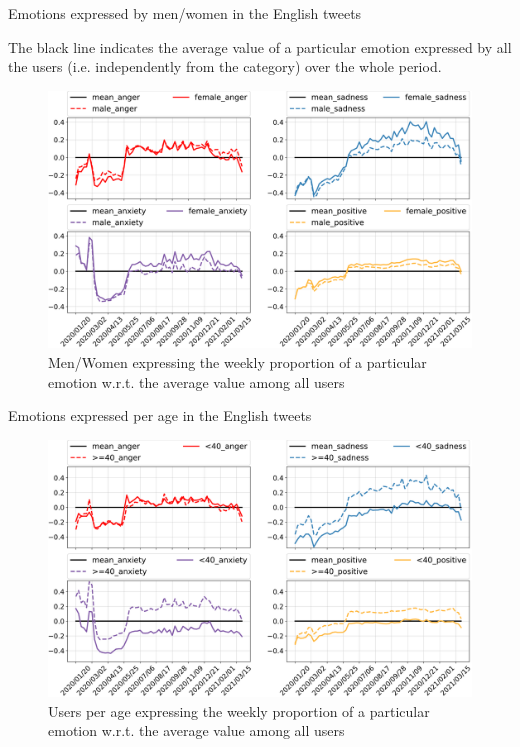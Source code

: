 \documentclass[9pt,aspectratio=1610]{beamer}  %
\begin{document}
\begin{frame}{Emotions expressed by men/women in the English tweets}

    The black line indicates the average value of a particular emotion expressed by all the users (i.e. independently from the category) over the whole period.

    \begin{figure}[H]
	    \centering
    	\includegraphics[scale=.25]{assets/img/en_4_categories_per_gender_over_mean_subplot.svg.pdf}
    	\caption{Men/Women expressing the weekly proportion of a particular emotion w.r.t. the average value among all users}
    	\label{fig:en-4-categories-per-gender-over-mean}
    \end{figure}
    
\end{frame}

\begin{frame}{Emotions expressed per age in the English tweets}

    \begin{figure}[H]
	    \centering
    	\includegraphics[scale=.30]{assets/img/en_4_categories_per_age_over_mean_subplot.svg.pdf}
    	\caption{Users per age expressing the weekly proportion of a particular emotion w.r.t. the average value among all users}
    	\label{fig:en-4-categories-per-age-over-mean}
    \end{figure}
    
\end{frame}
\end{document}
